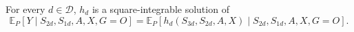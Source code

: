 For every \(d\in\mathcal D\), \(h_d\) is a square-integrable solution of
\[
\mathbb E_P[Y\mid S_{2d},S_{1d},A,X,G=O]
=\mathbb E_P[h_d(S_{3d},S_{2d},A,X)\mid S_{2d},S_{1d},A,X,G=O].
\]